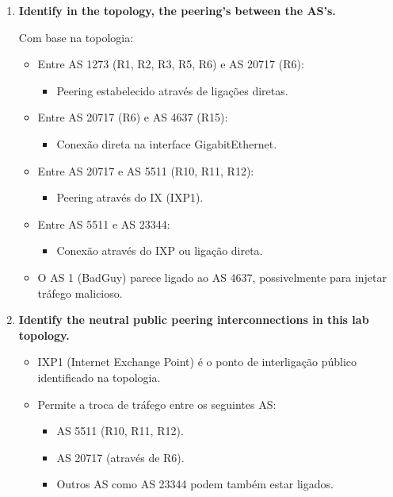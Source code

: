 \documentclass[11pt,english, openright, oneside]{book}
\begin{document}
\begin{enumerate}
  \item \textbf{Identify in the topology, the peering’s between the AS’s.} 
  \vspace{0.2cm}

  Com base na topologia:
  \vspace{0.2cm}

  \begin{itemize}
    \item Entre AS 1273 (R1, R2, R3, R5, R6) e AS 20717 (R6):
    \begin{itemize}
      \item Peering estabelecido através de ligações diretas.
    \end{itemize}
    \item Entre AS 20717 (R6) e AS 4637 (R15):
    \begin{itemize}
      \item Conexão direta na interface GigabitEthernet.
    \end{itemize}
    \item Entre AS 20717 e AS 5511 (R10, R11, R12):
    \begin{itemize}
      \item Peering através do IX (IXP1).
    \end{itemize}
    \item Entre AS 5511 e AS 23344:
    \begin{itemize}
      \item Conexão através do IXP ou ligação direta.
    \end{itemize}
    \item O AS 1 (BadGuy) parece ligado ao AS 4637, possivelmente para injetar tráfego malicioso.
  \end{itemize}
  \vspace{0.2cm}
  \item \textbf{Identify the neutral public peering interconnections in this lab topology.} 
  \vspace{0.2cm}

  \begin{itemize}
    \item IXP1 (Internet Exchange Point) é o ponto de interligação público identificado na topologia.
    \item Permite a troca de tráfego entre os seguintes AS:
    \begin{itemize}
      \item AS 5511 (R10, R11, R12).
      \item AS 20717 (através de R6).
      \item Outros AS como AS 23344 podem também estar ligados.
    \end{itemize}
  \end{itemize}
\end{enumerate}
\pagebreak
\end{document}
